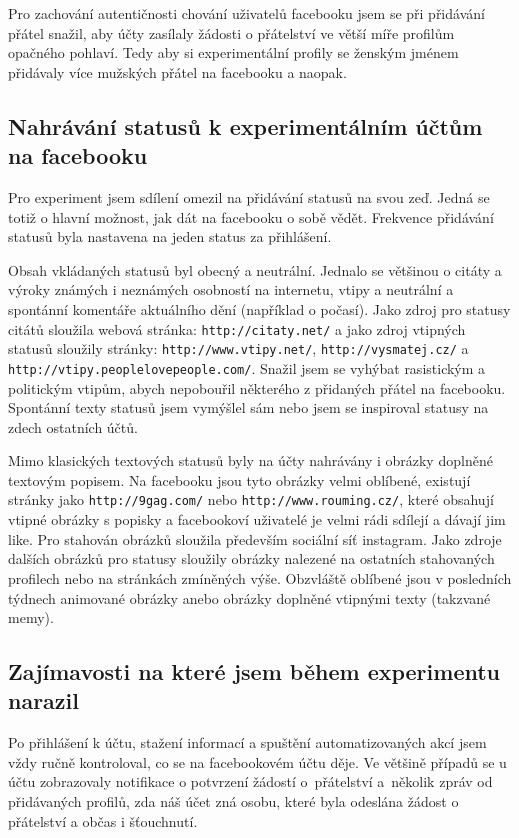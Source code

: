 \documentclass[thesis=M,czech]{FITthesis}[2013/05/10]
\begin{document}
Pro zachování autentičnosti chování uživatelů facebooku jsem se při přidávání přátel snažil, aby účty zasílaly žádosti o přátelství ve větší míře profilům opačného pohlaví. Tedy aby si experimentální profily se ženským jménem přidávaly více mužských přátel na facebooku a naopak. 

\subsection{Nahrávání statusů k experimentálním účtům na facebooku}

Pro experiment jsem sdílení omezil na přidávání statusů na svou zeď. Jedná se totiž o hlavní možnost, jak dát na facebooku o sobě vědět. Frekvence přidávání statusů byla nastavena na jeden status za přihlášení. 

Obsah vkládaných statusů byl obecný a neutrální. Jednalo se většinou o citáty a výroky známých i neznámých osobností na internetu, vtipy a neutrální a spontánní komentáře aktuálního dění (například o počasí). Jako zdroj pro statusy citátů sloužila webová stránka: \verb|http://citaty.net/| a jako zdroj vtipných statusů sloužily stránky: \verb|http://www.vtipy.net/|, \verb|http://vysmatej.cz/| a \verb|http://vtipy.peoplelovepeople.com/|. Snažil jsem se vyhýbat rasistickým a politickým vtipům, abych nepobouřil některého z přidaných přátel na facebooku. Spontánní texty statusů jsem vymýšlel sám nebo jsem se inspiroval statusy na zdech ostatních účtů.

Mimo klasických textových statusů byly na účty nahrávány i obrázky doplněné textovým popisem. Na facebooku jsou tyto obrázky velmi oblíbené, existují stránky jako \verb|http://9gag.com/| nebo \verb|http://www.rouming.cz/|, které obsahují vtipné obrázky s popisky a facebookoví uživatelé je velmi rádi  sdílejí a dávají jim like. Pro stahován obrázků sloužila především sociální síť instagram. Jako zdroje dalších obrázků pro statusy sloužily obrázky nalezené na ostatních stahovaných profilech nebo na stránkách zmíněných výše. Obzvláště oblíbené jsou v posledních týdnech animované obrázky anebo obrázky doplněné vtipnými texty (takzvané memy).

\subsection{Zajímavosti na které jsem během experimentu narazil}

Po přihlášení k účtu, stažení informací a spuštění automatizovaných akcí jsem vždy ručně kontroloval, co se na facebookovém účtu děje. Ve většině případů se u účtu zobrazovaly notifikace o potvrzení žádostí o~přátelství a~několik zpráv od přidávaných profilů, zda náš účet zná osobu, které byla odeslána žádost o přátelství a občas i šťouchnutí.
\end{document}

